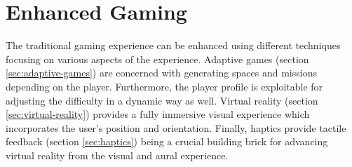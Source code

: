 \section{Enhanced Gaming} \label{sec:enhanced-gaming}
The traditional gaming experience can be enhanced using different techniques focusing on various aspects of the experience.
Adaptive games (section \ref{sec:adaptive-games}) are concerned with generating spaces and missions depending on the player.
Furthermore, the player profile is exploitable for adjusting the difficulty in a dynamic way as well.
Virtual reality (section \ref{sec:virtual-reality}) provides a fully immersive visual experience which incorporates the user's position and orientation.
Finally, haptics provide tactile feedback (section \ref{sec:haptics}) being a crucial building brick for advancing virtual reality from the visual and aural experience.



